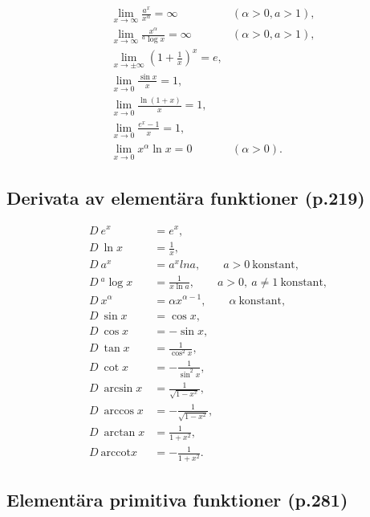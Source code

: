 \documentclass[11pt]{article}
\begin{document}
\begin{align}
    &\lim_{x \to \infty} \frac{a^x}{x^\alpha} = \infty \quad &(\alpha > 0, a > 1),\\
    &\lim_{x \to \infty} \frac{x^\alpha}{{}^a\log x} = \infty \quad &(\alpha > 0, a > 1),\\
    &\lim_{x \to \pm \infty} \left( 1 + \frac{1}{x} \right)^x = e,\\
    &\lim_{x \to 0} \frac{\sin x}{x} = 1,\\
    &\lim_{x \to 0} \frac{\ln(1 + x)}{x} = 1,\\
    &\lim_{x \to 0} \frac{e^x - 1}{x} = 1,\\
    &\lim_{x \to 0} x^\alpha \ln x = 0 \quad &(\alpha > 0).
\end{align}

\subsection{Derivata av elementära funktioner (p.219)}

\begin{align}
    D\ e^x &= e^x,\\
    D\ \ln x &= \frac{1}{x},\\
    D\ a^x &= a^x ln a, \qquad a > 0\ \mathrm{konstant},\\
    D\ {}^{a}\log x &= \frac{1}{x \ln a}, \qquad a > 0,\ a \neq 1\ \mathrm{konstant},\\
    D\ x^\alpha &= \alpha x^{\alpha - 1}, \qquad \alpha\ \mathrm{konstant},\\
    D\ \sin x &= \cos x,\\
    D\ \cos x &= -\sin x,\\
    D\ \tan x &= \frac{1}{\cos^2 x},\\
    D\ \cot x &= -\frac{1}{\sin^2 x},\\
    D\ \arcsin x &= \frac{1}{\sqrt{1 - x^x}},\\
    D\ \arccos x &= -\frac{1}{\sqrt{1 - x^2}},\\
    D\ \arctan x &= \frac{1}{1 + x^2},\\
    D\ \mathrm{arccot} x &= -\frac{1}{1 + x^2}.
\end{align}

\subsection{Elementära primitiva funktioner (p.281)}
\end{document}
